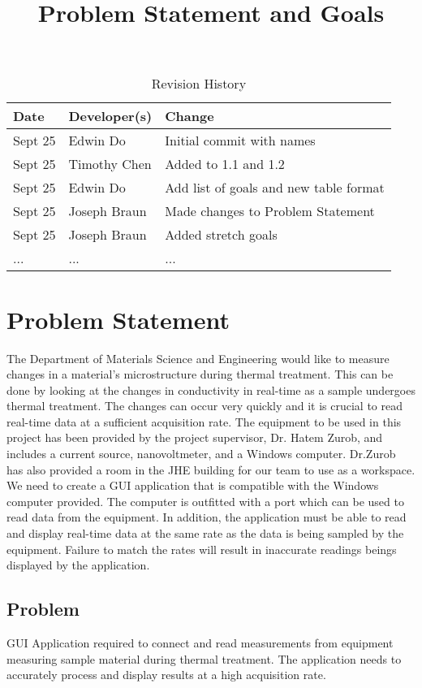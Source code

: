 \documentclass[12pt, titlepage]{article}
\title{Problem Statement and Goals\\\progname}
\author{\authname}
\date{}
\begin{document}
\maketitle

\begin{table}[hp]
\caption{Revision History} \label{TblRevisionHistory}
\begin{tabularx}{\textwidth}{llX}
\toprule
\textbf{Date} & \textbf{Developer(s)} & \textbf{Change}\\
\midrule
Sept 25 & Edwin Do & Initial commit with names\\
Sept 25 & Timothy Chen & Added to 1.1 and 1.2 \\
Sept 25 & Edwin Do & Add list of goals and new table format\\
Sept 25 & Joseph Braun & Made changes to Problem Statement \\
Sept 25 & Joseph Braun & Added stretch goals \\
... & ... & ...\\
\bottomrule
\end{tabularx}
\end{table}

\section{Problem Statement}
The Department of Materials Science and Engineering would like to measure changes in a material's microstructure
during thermal treatment. This can be done by looking at the changes in conductivity in real-time as a sample undergoes 
thermal treatment. The changes can occur very quickly and it is crucial to read real-time data at a sufficient acquisition rate.
The equipment to be used in this project has been provided by the project supervisor, Dr. Hatem Zurob, and includes a current source, nanovoltmeter, and a Windows computer. 
Dr.Zurob has also provided a room in the JHE building for our team to use as a workspace. 
We need to create a GUI application that is compatible with the Windows computer provided.
The computer is outfitted with a port which can be used to read data from the equipment.
In addition, the application must be able to read and display real-time data at the same rate as the data is being sampled by the equipment. Failure to match the rates will result in inaccurate readings beings displayed by the application.

\subsection{Problem}
GUI Application required to connect and read measurements from equipment measuring sample material during thermal treatment.
The application needs to accurately process and display results at a high acquisition rate.
\end{document}

